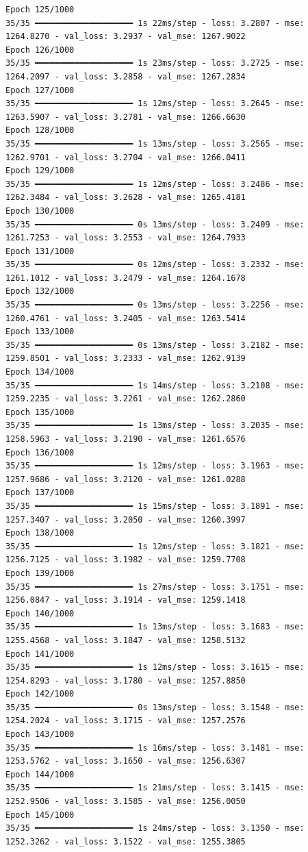 \documentclass[
  letterpaper,
  DIV=11,
  numbers=noendperiod]{scrreprt}
\begin{document}
\begin{verbatim}
Epoch 125/1000
35/35 ━━━━━━━━━━━━━━━━━━━━ 1s 22ms/step - loss: 3.2807 - mse: 1264.8270 - val_loss: 3.2937 - val_mse: 1267.9022
Epoch 126/1000
35/35 ━━━━━━━━━━━━━━━━━━━━ 1s 23ms/step - loss: 3.2725 - mse: 1264.2097 - val_loss: 3.2858 - val_mse: 1267.2834
Epoch 127/1000
35/35 ━━━━━━━━━━━━━━━━━━━━ 1s 12ms/step - loss: 3.2645 - mse: 1263.5907 - val_loss: 3.2781 - val_mse: 1266.6630
Epoch 128/1000
35/35 ━━━━━━━━━━━━━━━━━━━━ 1s 13ms/step - loss: 3.2565 - mse: 1262.9701 - val_loss: 3.2704 - val_mse: 1266.0411
Epoch 129/1000
35/35 ━━━━━━━━━━━━━━━━━━━━ 1s 12ms/step - loss: 3.2486 - mse: 1262.3484 - val_loss: 3.2628 - val_mse: 1265.4181
Epoch 130/1000
35/35 ━━━━━━━━━━━━━━━━━━━━ 0s 13ms/step - loss: 3.2409 - mse: 1261.7253 - val_loss: 3.2553 - val_mse: 1264.7933
Epoch 131/1000
35/35 ━━━━━━━━━━━━━━━━━━━━ 0s 12ms/step - loss: 3.2332 - mse: 1261.1012 - val_loss: 3.2479 - val_mse: 1264.1678
Epoch 132/1000
35/35 ━━━━━━━━━━━━━━━━━━━━ 0s 13ms/step - loss: 3.2256 - mse: 1260.4761 - val_loss: 3.2405 - val_mse: 1263.5414
Epoch 133/1000
35/35 ━━━━━━━━━━━━━━━━━━━━ 0s 13ms/step - loss: 3.2182 - mse: 1259.8501 - val_loss: 3.2333 - val_mse: 1262.9139
Epoch 134/1000
35/35 ━━━━━━━━━━━━━━━━━━━━ 1s 14ms/step - loss: 3.2108 - mse: 1259.2235 - val_loss: 3.2261 - val_mse: 1262.2860
Epoch 135/1000
35/35 ━━━━━━━━━━━━━━━━━━━━ 1s 13ms/step - loss: 3.2035 - mse: 1258.5963 - val_loss: 3.2190 - val_mse: 1261.6576
Epoch 136/1000
35/35 ━━━━━━━━━━━━━━━━━━━━ 1s 12ms/step - loss: 3.1963 - mse: 1257.9686 - val_loss: 3.2120 - val_mse: 1261.0288
Epoch 137/1000
35/35 ━━━━━━━━━━━━━━━━━━━━ 1s 15ms/step - loss: 3.1891 - mse: 1257.3407 - val_loss: 3.2050 - val_mse: 1260.3997
Epoch 138/1000
35/35 ━━━━━━━━━━━━━━━━━━━━ 1s 12ms/step - loss: 3.1821 - mse: 1256.7125 - val_loss: 3.1982 - val_mse: 1259.7708
Epoch 139/1000
35/35 ━━━━━━━━━━━━━━━━━━━━ 1s 27ms/step - loss: 3.1751 - mse: 1256.0847 - val_loss: 3.1914 - val_mse: 1259.1418
Epoch 140/1000
35/35 ━━━━━━━━━━━━━━━━━━━━ 1s 13ms/step - loss: 3.1683 - mse: 1255.4568 - val_loss: 3.1847 - val_mse: 1258.5132
Epoch 141/1000
35/35 ━━━━━━━━━━━━━━━━━━━━ 1s 12ms/step - loss: 3.1615 - mse: 1254.8293 - val_loss: 3.1780 - val_mse: 1257.8850
Epoch 142/1000
35/35 ━━━━━━━━━━━━━━━━━━━━ 0s 13ms/step - loss: 3.1548 - mse: 1254.2024 - val_loss: 3.1715 - val_mse: 1257.2576
Epoch 143/1000
35/35 ━━━━━━━━━━━━━━━━━━━━ 1s 16ms/step - loss: 3.1481 - mse: 1253.5762 - val_loss: 3.1650 - val_mse: 1256.6307
Epoch 144/1000
35/35 ━━━━━━━━━━━━━━━━━━━━ 1s 21ms/step - loss: 3.1415 - mse: 1252.9506 - val_loss: 3.1585 - val_mse: 1256.0050
Epoch 145/1000
35/35 ━━━━━━━━━━━━━━━━━━━━ 1s 24ms/step - loss: 3.1350 - mse: 1252.3262 - val_loss: 3.1522 - val_mse: 1255.3805

\end{verbatim}
\end{document}
